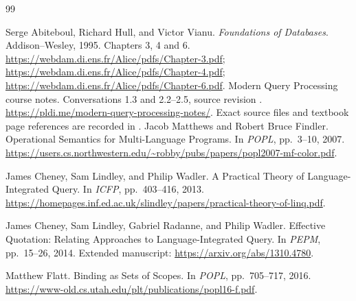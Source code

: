 \begin{thebibliography}{99}
\raggedright
{} Serge Abiteboul, Richard Hull, and Victor Vianu.
\emph{Foundations of Databases}. Addison--Wesley, 1995.
Chapters 3, 4 and 6.\newline
\url{https://webdam.di.ens.fr/Alice/pdfs/Chapter-3.pdf};\newline
\url{https://webdam.di.ens.fr/Alice/pdfs/Chapter-4.pdf};\newline
\url{https://webdam.di.ens.fr/Alice/pdfs/Chapter-6.pdf}.
 Modern Query Processing course notes.
Conversations 1.3 and 2.2--2.5, source revision
.\newline
\url{https://pldi.me/modern-query-processing-notes/}.
Exact source files and textbook page references are recorded in
.
Jacob Matthews and Robert Bruce Findler.
Operational Semantics for Multi-Language Programs.
In \emph{POPL}, pp.~3--10, 2007.
\url{https://users.cs.northwestern.edu/~robby/pubs/papers/popl2007-mf-color.pdf}.

James Cheney, Sam Lindley, and Philip Wadler.
A Practical Theory of Language-Integrated Query.
In \emph{ICFP}, pp.~403--416, 2013.
\url{https://homepages.inf.ed.ac.uk/slindley/papers/practical-theory-of-linq.pdf}.

James Cheney, Sam Lindley, Gabriel Radanne, and Philip Wadler.
Effective Quotation: Relating Approaches to Language-Integrated Query.
In \emph{PEPM}, pp.~15--26, 2014. Extended manuscript:
\url{https://arxiv.org/abs/1310.4780}.

Matthew Flatt. Binding as Sets of Scopes.
In \emph{POPL}, pp.~705--717, 2016.
\url{https://www-old.cs.utah.edu/plt/publications/popl16-f.pdf}.


\end{thebibliography}
